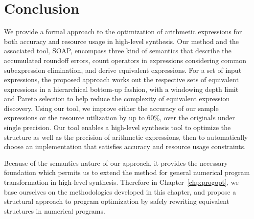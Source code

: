 \section{Conclusion}
\label{sec:conclusion}

We provide a formal approach to the optimization of arithmetic expressions
for both accuracy and resource usage in high-level synthesis. Our method and
the associated tool, SOAP, encompass three kind of semantics that describe
the accumulated roundoff errors, count operators in expressions considering
common subexpression elimination, and derive equivalent expressions. For a
set of input expressions, the proposed approach works out the respective
sets of equivalent expressions in a hierarchical bottom-up fashion, with a
windowing depth limit and Pareto selection to help reduce the complexity of
equivalent expression discovery. Using our tool, we improve either the accuracy
of our sample expressions or the resource utilization by up to 60\%, over the
originals under single precision. Our tool enables a high-level synthesis tool
to optimize the structure as well as the precision of arithmetic expressions,
then to automatically choose an implementation that satisfies accuracy and
resource usage constraints.

Because of the semantics nature of our approach, it provides the necessary
foundation which permits us to extend the method for general numerical program
transformation in high-level synthesis. Therefore in Chapter~\ref{chp:progopt},
we base ourselves on the methodologies developed in this chapter, and propose
a structural approach to program optimization by safely rewriting equivalent
structures in numerical programs.
